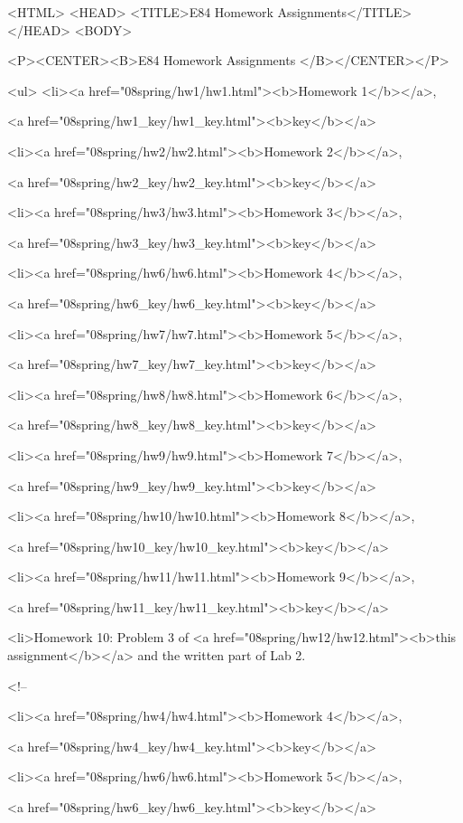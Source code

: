 
<HTML>
<HEAD>
   <TITLE>E84 Homework Assignments</TITLE>
</HEAD>
<BODY>

<P><CENTER><B>E84 Homework Assignments
</B></CENTER></P>

<ul>
<li><a href="08spring/hw1/hw1.html"><b>Homework 1</b></a>,

    <a href="08spring/hw1_key/hw1_key.html"><b>key</b></a>

<li><a href="08spring/hw2/hw2.html"><b>Homework 2</b></a>,

    <a href="08spring/hw2_key/hw2_key.html"><b>key</b></a>

<li><a href="08spring/hw3/hw3.html"><b>Homework 3</b></a>,

    <a href="08spring/hw3_key/hw3_key.html"><b>key</b></a>

<li><a href="08spring/hw6/hw6.html"><b>Homework 4</b></a>,

    <a href="08spring/hw6_key/hw6_key.html"><b>key</b></a>

<li><a href="08spring/hw7/hw7.html"><b>Homework 5</b></a>,

    <a href="08spring/hw7_key/hw7_key.html"><b>key</b></a>

<li><a href="08spring/hw8/hw8.html"><b>Homework 6</b></a>,

    <a href="08spring/hw8_key/hw8_key.html"><b>key</b></a>

<li><a href="08spring/hw9/hw9.html"><b>Homework 7</b></a>,

    <a href="08spring/hw9_key/hw9_key.html"><b>key</b></a>

<li><a href="08spring/hw10/hw10.html"><b>Homework 8</b></a>,

    <a href="08spring/hw10_key/hw10_key.html"><b>key</b></a>

<li><a href="08spring/hw11/hw11.html"><b>Homework 9</b></a>,

    <a href="08spring/hw11_key/hw11_key.html"><b>key</b></a>

<li>Homework 10: Problem 3 of 
<a href="08spring/hw12/hw12.html"><b>this assignment</b></a>
and the written part of Lab 2.

<!--


<li><a href="08spring/hw4/hw4.html"><b>Homework 4</b></a>,

    <a href="08spring/hw4_key/hw4_key.html"><b>key</b></a>

<li><a href="08spring/hw6/hw6.html"><b>Homework 5</b></a>,

    <a href="08spring/hw6_key/hw6_key.html"><b>key</b></a>

